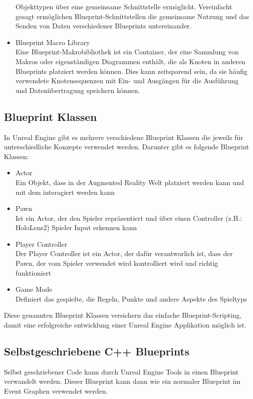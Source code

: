 \begin{itemize}
    Objekttypen über eine gemeinsame Schnittstelle ermöglicht. Vereinfacht gesagt ermöglichen Blueprint-Schnittstellen
    die gemeinsame Nutzung und das Senden von Daten verschiedener Blueprints untereinander.
    \item Blueprint Macro Library\\
    Eine Blueprint-Makrobibliothek ist ein Container, der eine Sammlung von Makros oder eigenständigen Diagrammen enthält,
    die als Knoten in anderen Blueprints platziert werden können. Dies kann zeitsparend sein, da sie häufig verwendete
    Knotensequenzen mit Ein- und Ausgängen für die Ausführung und Datenübertragung speichern können.
\end{itemize}

\subsection{Blueprint Klassen}
In Unreal Engine gibt es mehrere verschiedene Blueprint Klassen die jeweils für unterschiedliche
Konzepte verwendet werden. Darunter gibt es folgende Blueprint Klassen:
\begin{itemize}
    \item Actor \\
    Ein Objekt, dass in der Augmented Reality Welt platziert werden kann und mit
    dem interagiert werden kann
    \item Pawn \\
    Ist ein Actor, der den Spieler repräsentiert und über einen Controller (z.B.: HoloLens2)
    Spieler Input erkennen kann
    \item Player Controller \\
    Der Player Controller ist ein Actor, der dafür verantworlich ist, dass der
    Pawn, der vom Spieler verwendet wird kontrolliert wird und richtig funktioniert
    \item Game Mode \\
    Definiert das gespielte, die Regeln, Punkte und andere Aspekte des Spieltyps
\end{itemize}
Diese genannten Blueprint Klassen versichern das einfache Blueprint-Scripting, damit eine erfolgreiche
entwicklung einer Unreal Engine Applikation möglich ist.

\subsection{Selbstgeschriebene C++ Blueprints}
Selbst geschriebener Code kann durch Unreal Engine Tools in einen Blueprint verwandelt werden.
Dieser Blueprint kann dann wie ein normaler Blueprint im Event Graphen verwendet werden.


